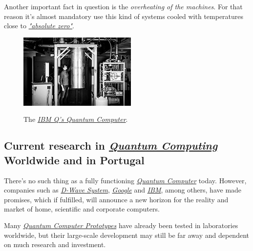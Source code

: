 \documentclass[conference]{IEEEtran}
\begin{document}
Another important fact in question is the \textit{overheating of the machines}. For that reason it's almost mandatory use this kind of systems cooled with temperatures close to \href{https://en.wikipedia.org/wiki/Absolute_zero}{\textit{"absolute zero"}}.

\vspace{4pt}

\begin{center}
  \begin{figure}[!htbp]
    \centerline{\href{https://www.research.ibm.com/ibm-q/}{\includegraphics{imgs/fig-5.png}}}
    \caption{The \href{https://www.research.ibm.com/ibm-q/}{\textit{IBM Q's Quantum Computer}}.}
    \label{fig}
  \end{figure}
\end{center}

\subsection{Current research in \href{https://en.wikipedia.org/wiki/Quantum_computing}{\textit{Quantum Computing}} Worldwide and in Portugal}\label{AA}

\vspace{4pt}

There's no such thing as a fully functioning \href{https://en.wikipedia.org/wiki/Quantum_computing}{\textit{Quantum Computer}} today. However, companies such as \href{https://en.wikipedia.org/wiki/D-Wave_Systems}{\textit{D-Wave System}}, \href{https://en.wikipedia.org/wiki/Google}{\textit{Google}} and \href{https://en.wikipedia.org/wiki/IBM}{\textit{IBM}}, among others, have made promises, which if fulfilled, will announce a new horizon for the reality and market of home, scientific and corporate computers.

\vspace{4pt}

Many \href{https://en.wikipedia.org/wiki/Quantum_computing}{\textit{Quantum Computer Prototypes}} have already been tested in laboratories worldwide, but their large-scale development may still be far away and dependent on much research and investment.
\end{document}
